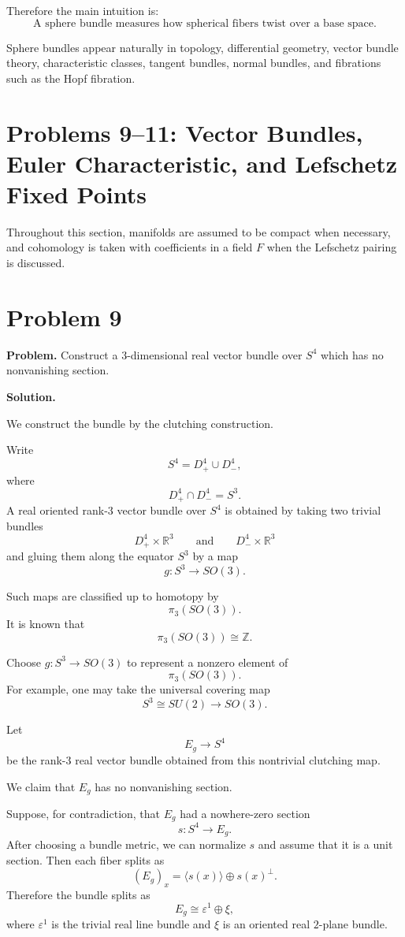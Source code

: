 \documentclass[12pt,a4paper]{article}
\theoremstyle{notespace}
\begin{document}
Therefore the main intuition is:
\[
\boxed{
	\text{A sphere bundle measures how spherical fibers twist over a base space.}
}
\]

Sphere bundles appear naturally in topology, differential geometry, vector bundle theory, characteristic classes, tangent bundles, normal bundles, and fibrations such as the Hopf fibration.
	
\section{Problems 9--11: Vector Bundles, Euler Characteristic, and Lefschetz Fixed Points}

Throughout this section, manifolds are assumed to be compact when necessary, and
cohomology is taken with coefficients in a field \(F\) when the Lefschetz
pairing is discussed.

\section{Problem 9}

\textbf{Problem.}
Construct a \(3\)-dimensional real vector bundle over \(S^4\) which has no
nonvanishing section.

\medskip

\noindent\textbf{Solution.}

We construct the bundle by the clutching construction.

Write
\[
S^4=D^4_+\cup D^4_-,
\]
where
\[
D^4_+\cap D^4_-=S^3.
\]
A real oriented rank-\(3\) vector bundle over \(S^4\) is obtained by taking two
trivial bundles
\[
D^4_+\times \mathbb R^3
\qquad\text{and}\qquad
D^4_-\times \mathbb R^3
\]
and gluing them along the equator \(S^3\) by a map
\[
g:S^3\to SO(3).
\]

Such maps are classified up to homotopy by
\[
\pi_3(SO(3)).
\]
It is known that
\[
\pi_3(SO(3))\cong \mathbb Z.
\]

Choose \(g:S^3\to SO(3)\) to represent a nonzero element of
\[
\pi_3(SO(3)).
\]
For example, one may take the universal covering map
\[
S^3\cong SU(2)\longrightarrow SO(3).
\]

Let
\[
E_g\to S^4
\]
be the rank-\(3\) real vector bundle obtained from this nontrivial clutching map.

We claim that \(E_g\) has no nonvanishing section.

Suppose, for contradiction, that \(E_g\) had a nowhere-zero section
\[
s:S^4\to E_g.
\]
After choosing a bundle metric, we can normalize \(s\) and assume that it is a
unit section. Then each fiber splits as
\[
(E_g)_x
=
\langle s(x)\rangle\oplus s(x)^\perp.
\]
Therefore the bundle splits as
\[
E_g\cong \varepsilon^1\oplus \xi,
\]
where \(\varepsilon^1\) is the trivial real line bundle and \(\xi\) is an
oriented real \(2\)-plane bundle.
\end{document}
